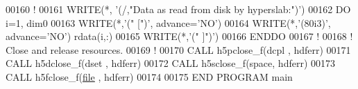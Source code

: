 \begin{DoxyCode}
00160   \textcolor{comment}{!}
00161   \textcolor{keyword}{WRITE}(*, \textcolor{stringliteral}{'(/,"Data as read from disk by hyperslab:")'})
00162   \textcolor{keywordflow}{DO} i=1, dim0
00163      \textcolor{keyword}{WRITE}(*,\textcolor{stringliteral}{'(" [")'}, advance=\textcolor{stringliteral}{'NO'})
00164      \textcolor{keyword}{WRITE}(*,\textcolor{stringliteral}{'(80i3)'}, advance=\textcolor{stringliteral}{'NO'}) rdata(i,:)
00165      \textcolor{keyword}{WRITE}(*,\textcolor{stringliteral}{'(" ]")'})
00166 \textcolor{keywordflow}{  ENDDO}
00167   \textcolor{comment}{!}
00168   \textcolor{comment}{! Close and release resources.}
00169   \textcolor{comment}{!}
00170   \textcolor{keyword}{CALL }h5pclose\_f(dcpl , hdferr)
00171   \textcolor{keyword}{CALL }h5dclose\_f(dset , hdferr)
00172   \textcolor{keyword}{CALL }h5sclose\_f(space, hdferr)
00173   \textcolor{keyword}{CALL }h5fclose\_f(\hyperlink{structfile}{file} , hdferr)
00174 
00175 \textcolor{keyword}{END PROGRAM }main
\end{DoxyCode}
